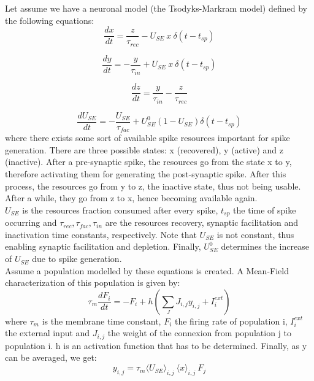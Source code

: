 \documentclass{article}
\begin{document}
Let assume we have a neuronal model (the Tsodyks-Markram model) defined by the following equations:
\[
\frac{dx}{dt} = \frac{z}{\tau_{rec}} - U_{SE}\: x\: \delta (t - t_{sp})
\]

\[
\frac{dy}{dt} = -\frac{y}{\tau_{in}} + U_{SE}\: x\: \delta (t - t_{sp})
\]

\[
\frac{dz}{dt} = \frac{y}{\tau_{in}} - \frac{z}{\tau_{rec}}
\]

\[
\frac{d U_{SE}}{dt} = -\frac{U_{SE}}{\tau_{fac}} + U_{SE}^{0}(1 - U_{SE})\delta(t - t_{sp})
\]
where there exists some sort of available spike resources important for spike generation. There are three possible states: x (recovered), y (active) and z (inactive). After a pre-synaptic spike, the resources go from the state x to 
y, therefore activating them for generating the post-synaptic spike. After this process, the resources go from y to z, the inactive state, thus not being usable. After a while, they go from z to x, hence becoming available again.\\

\(U_{SE}\) is the resources fraction consumed after every spike, \(t_{sp}\) the time of spike occurring and \(\tau_{rec}, \tau_{fac}, \tau_{in} \) are the resources recovery, synaptic facilitation and inactivation time constants, respectively. Note that \(U_{SE}\) is not constant, thus enabling synaptic facilitation and depletion. Finally, \(U_{SE}^{0}\) determines the increase of \(U_{SE}\) due to spike generation. \\

Assume a population modelled by these equations is created. A Mean-Field characterization of this population is given by:
\[
\tau_{m} \frac{dF_{i}}{dt} = -F_{i} + h(\sum_{J}{J_{i,j} y_{i,j} + I_{i}^{ext}})
\]
where \(\tau_{m}\) is the membrane time constant, \(F_{i}\) the firing rate of population i, \(I_{i}^{ext}\) the external input and \(J_{i,j}\) the weight of the connexion from population j to population i. h is an activation function that has to be determined. Finally, as y can be averaged, we get:
\[
y_{i,j} = \tau_{m} \langle U_{SE}\rangle_{i,j} \: \langle x\rangle_{i,j} \: F_{j} 
\]
\end{document}
